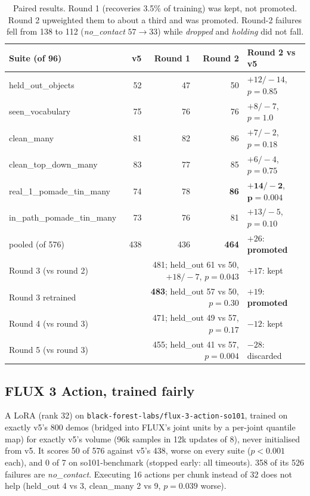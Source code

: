 \documentclass[10pt]{article}
\begin{document}
\begin{table}[h]\centering\small
\begin{tabular}{lrrrl}\toprule
Suite (of 96) & v5 & Round 1 & Round 2 & Round 2 vs v5\\\midrule
held\_out\_objects & 52 & 47 & 50 & $+12/-14$, $p=0.85$\\
seen\_vocabulary & 75 & 76 & 76 & $+8/-7$, $p=1.0$\\
clean\_many & 81 & 82 & 86 & $+7/-2$, $p=0.18$\\
clean\_top\_down\_many & 83 & 77 & 85 & $+6/-4$, $p=0.75$\\
real\_1\_pomade\_tin\_many & 74 & 78 & \textbf{86} & $\mathbf{+14/-2}$, $\mathbf{p=0.004}$\\
in\_path\_pomade\_tin\_many & 73 & 76 & 81 & $+13/-5$, $p=0.10$\\\midrule
pooled (of 576) & 438 & 436 & \textbf{464} & $+26$: \textbf{promoted}\\\midrule
Round 3 (vs round 2) & \multicolumn{3}{r}{481; held\_out 61 vs 50, $+18/-7$, $p=0.043$} & $+17$: kept\\
Round 3 retrained & \multicolumn{3}{r}{\textbf{483}; held\_out 57 vs 50, $p=0.30$} & $+19$: \textbf{promoted}\\
Round 4 (vs round 3) & \multicolumn{3}{r}{471; held\_out 49 vs 57, $p=0.17$} & $-12$: kept\\
Round 5 (vs round 3) & \multicolumn{3}{r}{455; held\_out 41 vs 57, $p=0.004$} & $-28$: discarded\\\bottomrule
\end{tabular}
\caption{Paired results. Round 1 (recoveries 3.5\% of training) was kept, not promoted. Round 2 upweighted them to about a
third and was promoted. Round-2 failures fell from 138 to 112 (\emph{no\_contact} $57\to33$) while \emph{dropped} and
\emph{holding} did not fall.}\label{tab:dagger}
\end{table}

\subsection{FLUX 3 Action, trained fairly}
A LoRA (rank 32) on \texttt{black-forest-labs/flux-3-action-so101}, trained on exactly v5's 800 demos (bridged into
FLUX's joint units by a per-joint quantile map) for exactly v5's volume (96k samples in 12k updates of 8), never
initialised from v5. It scores 50 of 576 against v5's 438, worse on every suite ($p<0.001$ each), and 0 of 7 on
so101-benchmark (stopped early: all timeouts). 358 of its 526 failures are \emph{no\_contact}. Executing 16 actions per
chunk instead of 32 does not help (held\_out 4 vs 3, clean\_many 2 vs 9, $p=0.039$ worse).
\end{document}
